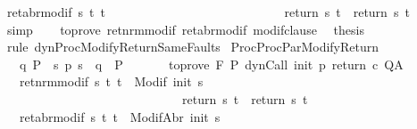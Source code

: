\begin{isabellebody}
\ ret{\isacharunderscore}abr{\isacharunderscore}modif{\isacharprime}{\isacharcolon}\ {\isachardoublequoteopen}{\isasymforall}s\ t{\isachardot}\ t\ {\isasymin}\ {\isacharbraceleft}{\isacharbraceright}\ \isanewline
\ \ \ \ \ \ \ \ \ \ \ \ \ \ \ \ \ \ \ \ \ \ \ \ {\isasymlongrightarrow}\ return{\isacharprime}\ s\ t\ {\isacharequal}\ return\ s\ t{\isachardoublequoteclose}\isanewline
\ \ \ \ \isamarkupfalse%
\ simp\isanewline
\ \ \isamarkupfalse%
\ to{\isacharunderscore}prove\ ret{\isacharunderscore}nrm{\isacharunderscore}modif{\isacharprime}\ ret{\isacharunderscore}abr{\isacharunderscore}modif{\isacharprime}\ modif{\isacharunderscore}clause\ \isamarkupfalse%
\ {\isacharquery}thesis\isanewline
\ \ \ \ \isamarkupfalse%
\ {\isacharparenleft}rule\ dynProcModifyReturnSameFaults{\isacharparenright}\isanewline
{}\isamarkupfalse%
%
\endisatagproof
{\isafoldproof}%
%
\isadelimproof
\isanewline
%
\endisadelimproof
\isanewline
\isanewline
{}\isamarkupfalse%
\ ProcProcParModifyReturn{\isacharcolon}\ \isanewline
\ \ \ q{\isacharcolon}\ {\isachardoublequoteopen}P\ {\isasymsubseteq}\ {\isacharbraceleft}s{\isachardot}\ p\ s\ {\isacharequal}\ q{\isacharbraceright}\ {\isasyminter}\ P{\isacharprime}{\isachardoublequoteclose}\isanewline
\ \ \ %
\isanewline
\ \ \ to{\isacharunderscore}prove{\isacharcolon}\ {\isachardoublequoteopen}{\isasymGamma}{\isacharcomma}{\isasymTheta}{\isasymturnstile}\isactrlbsub {\isacharslash}F\isactrlesub \ P{\isacharprime}\ {\isacharparenleft}dynCall\ init\ p\ return{\isacharprime}\ c{\isacharparenright}\ Q{\isacharcomma}A{\isachardoublequoteclose}\isanewline
\ \ \ ret{\isacharunderscore}nrm{\isacharunderscore}modif{\isacharcolon}\ {\isachardoublequoteopen}{\isasymforall}s\ t{\isachardot}\ t\ {\isasymin}\ {\isacharparenleft}Modif\ {\isacharparenleft}init\ s{\isacharparenright}{\isacharparenright}\ \isanewline
\ \ \ \ \ \ \ \ \ \ \ \ \ \ \ \ \ \ \ \ \ \ \ \ \ \ \ \ {\isasymlongrightarrow}\ return{\isacharprime}\ s\ t\ {\isacharequal}\ return\ s\ t{\isachardoublequoteclose}\isanewline
\ \ \ ret{\isacharunderscore}abr{\isacharunderscore}modif{\isacharcolon}\ {\isachardoublequoteopen}{\isasymforall}s\ t{\isachardot}\ t\ {\isasymin}\ {\isacharparenleft}ModifAbr\ {\isacharparenleft}init\ s{\isacharparenright}{\isacharparenright}\ \isanewline

\end{isabellebody}
